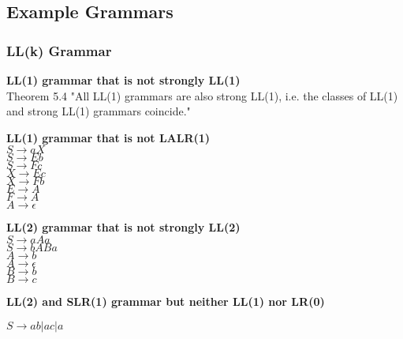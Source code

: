 \subsection{Example Grammars}
\begin{samepage}
\subsubsection{LL(k) Grammar}
\textbf{LL(1) grammar that is not strongly LL(1)}\\ %
    Theorem 5.4 "All LL(1) grammars are also strong LL(1), i.e. the classes of LL(1) and strong LL(1) grammars coincide."
\end{samepage}
\begin{samepage}
\textbf{LL(1) grammar that is not LALR(1)}\\ %
    $S\rightarrow aX$\\
    $S\rightarrow Eb$\\
    $S\rightarrow F c$\\
    $X\rightarrow Ec$\\
    $X\rightarrow F b$\\
    $E\rightarrow A$\\
    $F\rightarrow A$\\
    $A\rightarrow \epsilon$\\
\end{samepage}
\begin{samepage}
\textbf{LL(2) grammar that is not strongly LL(2)}\\ %
    $S \rightarrow aAa$\\
    $S \rightarrow bABa$\\
    $A \rightarrow b$\\
    $A \rightarrow \epsilon$\\
    $B \rightarrow b$\\
    $B \rightarrow c$\\
\end{samepage}
\begin{samepage}
\textbf{LL(2) and SLR(1) grammar but neither LL(1) nor LR(0)} %

    $S\rightarrow ab | ac | a$\\

\end{samepage}


